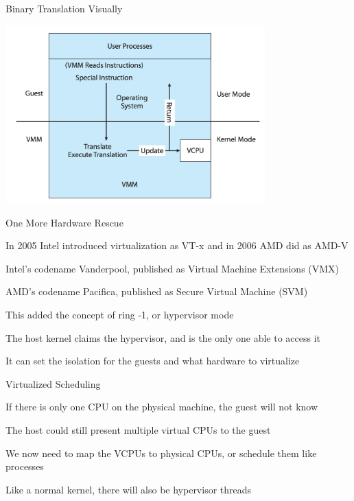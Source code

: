   \begin{frame}{Binary Translation Visually}
    \begin{center}
      \includegraphics[width=0.75\textwidth]{binary-translation.png}
    \end{center}
  \end{frame}

  \begin{frame}{One More Hardware Rescue}

    In 2005 Intel introduced virtualization as VT-x and in 2006 AMD did as AMD-V

    \hspace{2em} Intel's codename Vanderpool, published as Virtual
                 Machine Extensions (VMX)

    \hspace{2em} AMD's codename Pacifica, published as Secure Virtual
                 Machine (SVM)

    \vspace{2em}

    This added the concept of ring -1, or hypervisor mode

    \vspace{2em}

    The host kernel claims the hypervisor, and is the only one able to access
    it

    \hspace{2em} It can set the isolation for the guests and what hardware
                 to virtualize
  \end{frame}

  \begin{frame}{Virtualized Scheduling}

    If there is only one CPU on the physical machine, the guest will not know

    \hspace{2em} The host could still present multiple virtual CPUs to the guest

    \vspace{2em}

    We now need to map the VCPUs to physical CPUs, or schedule them like
    processes

    \hspace{2em} Like a normal kernel, there will also be hypervisor threads
  \end{frame}

